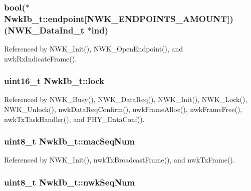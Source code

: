 \hypertarget{struct_nwk_ib__t_a6884c7984dc4010d48772d84fd9b83bc}{
\subsubsection[{endpoint}]{\setlength{\rightskip}{0pt plus 5cm}bool($\ast$ Nwk\-Ib\-\_\-t\-::endpoint\mbox{[}{\bf N\-W\-K\-\_\-\-E\-N\-D\-P\-O\-I\-N\-T\-S\-\_\-\-A\-M\-O\-U\-N\-T}\mbox{]})({\bf N\-W\-K\-\_\-\-Data\-Ind\-\_\-t} $\ast$ind)}}\label{struct_nwk_ib__t_a6884c7984dc4010d48772d84fd9b83bc}


Referenced by N\-W\-K\-\_\-\-Init(), N\-W\-K\-\_\-\-Open\-Endpoint(), and nwk\-Rx\-Indicate\-Frame().

\hypertarget{struct_nwk_ib__t_a577806f9b0e40c84e2c8235b3479f759}{
\subsubsection[{lock}]{\setlength{\rightskip}{0pt plus 5cm}uint16\-\_\-t Nwk\-Ib\-\_\-t\-::lock}}\label{struct_nwk_ib__t_a577806f9b0e40c84e2c8235b3479f759}


Referenced by N\-W\-K\-\_\-\-Busy(), N\-W\-K\-\_\-\-Data\-Req(), N\-W\-K\-\_\-\-Init(), N\-W\-K\-\_\-\-Lock(), N\-W\-K\-\_\-\-Unlock(), nwk\-Data\-Req\-Confirm(), nwk\-Frame\-Alloc(), nwk\-Frame\-Free(), nwk\-Tx\-Task\-Handler(), and P\-H\-Y\-\_\-\-Data\-Conf().

\hypertarget{struct_nwk_ib__t_a17330655f00d16fb7a4732d55c8ce646}{
\subsubsection[{mac\-Seq\-Num}]{\setlength{\rightskip}{0pt plus 5cm}uint8\-\_\-t Nwk\-Ib\-\_\-t\-::mac\-Seq\-Num}}\label{struct_nwk_ib__t_a17330655f00d16fb7a4732d55c8ce646}


Referenced by N\-W\-K\-\_\-\-Init(), nwk\-Tx\-Broadcast\-Frame(), and nwk\-Tx\-Frame().

\hypertarget{struct_nwk_ib__t_a7922253056ebd63dd2c8fce7164e71d6}{
\subsubsection[{nwk\-Seq\-Num}]{\setlength{\rightskip}{0pt plus 5cm}uint8\-\_\-t Nwk\-Ib\-\_\-t\-::nwk\-Seq\-Num}}\label{struct_nwk_ib__t_a7922253056ebd63dd2c8fce7164e71d6}



